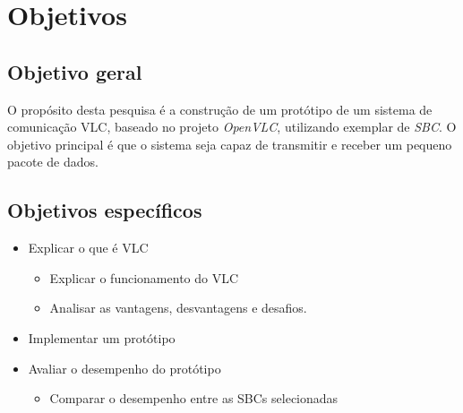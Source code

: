 \chapter{Objetivos}
\section{Objetivo geral}

O propósito desta pesquisa é a construção de um protótipo de um sistema de
comunicação VLC, baseado no projeto \textit{OpenVLC}, utilizando exemplar de \textit{SBC}. O objetivo principal é que o sistema seja capaz de transmitir e receber um pequeno pacote de dados.

\section{Objetivos específicos}

\begin{itemize}

  \item Explicar o que é VLC
    \begin{itemize}
      \item Explicar o funcionamento do VLC
      \item Analisar as vantagens, desvantagens e desafios.
    \end{itemize}

  \item Implementar um protótipo
  \item Avaliar o desempenho do protótipo
    \begin{itemize}
      \item Comparar o desempenho entre as SBCs selecionadas
    \end{itemize}

\end{itemize}

